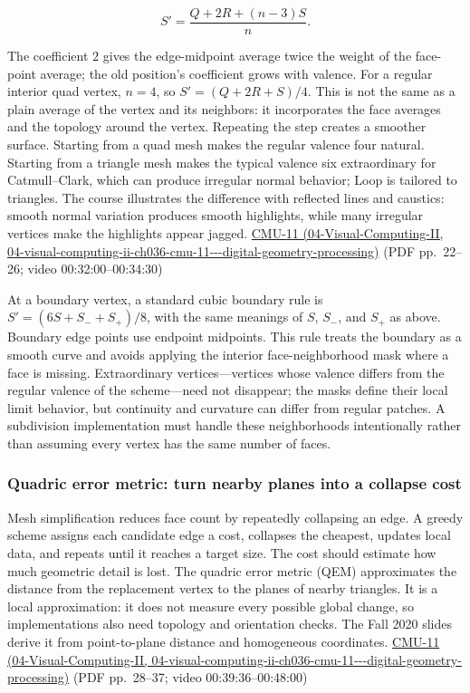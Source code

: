 \[
S'=\frac{Q+2R+(n-3)S}{n}.
\]

The coefficient \(2\) gives the edge-midpoint average twice the weight of the face-point average; the old position's coefficient grows with valence. For a regular interior quad vertex, \(n=4\), so \(S'=(Q+2R+S)/4\). This is not the same as a plain average of the vertex and its neighbors: it incorporates the face averages and the topology around the vertex. Repeating the step creates a smoother surface. Starting from a quad mesh makes the regular valence four natural. Starting from a triangle mesh makes the typical valence six extraordinary for Catmull--Clark, which can produce irregular normal behavior; Loop is tailored to triangles. The course illustrates the difference with reflected lines and caustics: smooth normal variation produces smooth highlights, while many irregular vertices make the highlights appear jagged. \href{../04-Visual-Computing-II/main.pdf\#nameddest=04-visual-computing-ii-ch036-cmu-11---digital-geometry-processing}{CMU-11 (04-Visual-Computing-II, 04-visual-computing-ii-ch036-cmu-11-\/-\/-digital-geometry-processing)} (PDF pp.~22--26; video 00:32:00--00:34:30)

At a boundary vertex, a standard cubic boundary rule is \(S'=(6S+S_-+S_+)/8\), with the same meanings of \(S\), \(S_-\), and \(S_+\) as above. Boundary edge points use endpoint midpoints. This rule treats the boundary as a smooth curve and avoids applying the interior face-neighborhood mask where a face is missing. Extraordinary vertices---vertices whose valence differs from the regular valence of the scheme---need not disappear; the masks define their local limit behavior, but continuity and curvature can differ from regular patches. A subdivision implementation must handle these neighborhoods intentionally rather than assuming every vertex has the same number of faces.

\subsubsection{Quadric error metric: turn nearby planes into a collapse cost}\label{03-visual-computing-i-ch002-quadric-error-metric-turn-nearby-planes-into-a-collapse-cost}

Mesh simplification reduces face count by repeatedly collapsing an edge. A greedy scheme assigns each candidate edge a cost, collapses the cheapest, updates local data, and repeats until it reaches a target size. The cost should estimate how much geometric detail is lost. The quadric error metric (QEM) approximates the distance from the replacement vertex to the planes of nearby triangles. It is a local approximation: it does not measure every possible global change, so implementations also need topology and orientation checks. The Fall 2020 slides derive it from point-to-plane distance and homogeneous coordinates. \href{../04-Visual-Computing-II/main.pdf\#nameddest=04-visual-computing-ii-ch036-cmu-11---digital-geometry-processing}{CMU-11 (04-Visual-Computing-II, 04-visual-computing-ii-ch036-cmu-11-\/-\/-digital-geometry-processing)} (PDF pp.~28--37; video 00:39:36--00:48:00)

